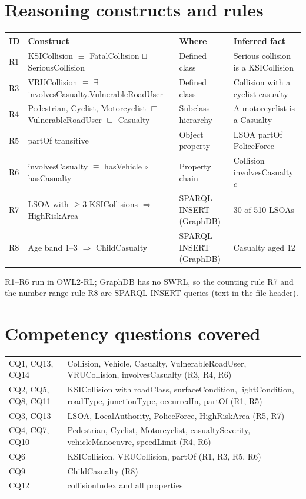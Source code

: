 \documentclass[10.5pt,a4paper]{article}
\begin{document}
\section{Reasoning constructs and rules}
\small
\begin{longtable}{L{0.8cm} L{6.2cm} L{4.2cm} L{4.8cm}}
\toprule \textbf{ID} & \textbf{Construct} & \textbf{Where} & \textbf{Inferred fact}\\\midrule
R1 & KSICollision $\equiv$ FatalCollision $\sqcup$ SeriousCollision & Defined class & Serious collision is a KSICollision\\
R3 & VRUCollision $\equiv$ $\exists$involvesCasualty.VulnerableRoadUser & Defined class & Collision with a cyclist casualty\\
R4 & Pedestrian, Cyclist, Motorcyclist $\sqsubseteq$ VulnerableRoadUser $\sqsubseteq$ Casualty & Subclass hierarchy & A motorcyclist is a Casualty\\
R5 & partOf transitive & Object property & LSOA partOf PoliceForce\\
R6 & involvesCasualty $\equiv$ hasVehicle $\circ$ hasCasualty & Property chain & Collision involvesCasualty $c$\\
R7 & LSOA with $\geq 3$ KSICollisions $\Rightarrow$ HighRiskArea & SPARQL INSERT (GraphDB) & 30 of 510 LSOAs\\
R8 & Age band 1--3 $\Rightarrow$ ChildCasualty & SPARQL INSERT (GraphDB) & Casualty aged 12\\
\bottomrule\end{longtable}
\normalsize
R1--R6 run in OWL2-RL; GraphDB has no SWRL, so the counting rule R7 and the number-range rule R8 are SPARQL INSERT queries (text in the file header).

\section{Competency questions covered}
\small
\begin{tabular}{L{2.3cm} L{13.7cm}}
\toprule CQ1, CQ13, CQ14 & Collision, Vehicle, Casualty, VulnerableRoadUser, VRUCollision, involvesCasualty (R3, R4, R6)\\
CQ2, CQ5, CQ8, CQ11 & KSICollision with roadClass, surfaceCondition, lightCondition, roadType, junctionType, occurredIn, partOf (R1, R5)\\
CQ3, CQ13 & LSOA, LocalAuthority, PoliceForce, HighRiskArea (R5, R7)\\
CQ4, CQ7, CQ10 & Pedestrian, Cyclist, Motorcyclist, casualtySeverity, vehicleManoeuvre, speedLimit (R4, R6)\\
CQ6 & KSICollision, VRUCollision, partOf (R1, R3, R5, R6)\\
CQ9 & ChildCasualty (R8)\\
CQ12 & collisionIndex and all properties\\
\bottomrule\end{tabular}
\normalsize
\end{document}
